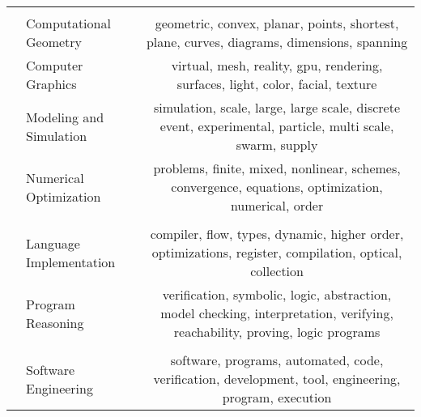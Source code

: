 \documentclass[reprint, twocolumn, aps, nofootinbib, superscriptaddress, longbibliography]{revtex4-1}
\begin{document}
\begin{table*}
\begin{tabularx}{\textwidth}{llC}
  &                                          &                                                                                                                                    \\
                              &                      Computational Geometry &                                            geometric, convex, planar, points, shortest, plane, curves, diagrams, dimensions, spanning \\
                              &                           Computer Graphics &                                                       virtual, mesh, reality, gpu, rendering, surfaces, light, color, facial, texture \\
                              &                     Modeling and Simulation &                             simulation, scale, large, large scale, discrete event, experimental, particle, multi scale, swarm, supply \\
                              &                      Numerical Optimization &                                   problems, finite, mixed, nonlinear, schemes, convergence, equations, optimization, numerical, order \\
                              \midrule

            &                                          &                                                                                                                                    \\
                              &                     Language Implementation &                               compiler, flow, types, dynamic, higher order, optimizations, register, compilation, optical, collection \\
                              &                           Program Reasoning &          verification, symbolic, logic, abstraction, model checking, interpretation, verifying, reachability, proving, logic programs \\
                              \midrule

             &                                          &                                                                                                                                    \\
                              &                        Software Engineering &                                 software, programs, automated, code, verification, development, tool, engineering, program, execution \\
                              \midrule


\end{tabularx}
\end{table*}
\end{document}
